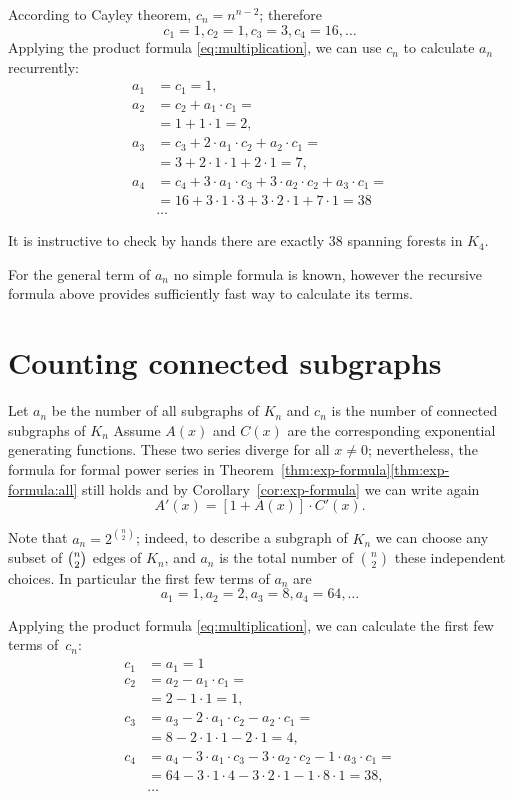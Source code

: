 According to Cayley theorem, $c_n=n^{n-2}$;
therefore 
\[c_1=1, c_2=1, c_3=3, c_4=16,\dots\]
Applying the product formula \ref{eq:multiplication}, we can use $c_n$ to calculate $a_n$ recurrently:
\begin{align*}
a_1&=c_1=1,
\\
a_2&=c_2+a_1\cdot c_1=
\\&=1+1\cdot 1=2,
\\
a_3&=c_3+2\cdot a_1\cdot c_2+ a_2\cdot c_1=
\\
&=3+2\cdot1\cdot 1+2\cdot 1=7,
\\
a_4&=c_4+3\cdot a_1\cdot c_3+3\cdot a_2\cdot c_2+a_3\cdot c_1=
\\&=16+3\cdot 1\cdot 3+3\cdot 2\cdot 1+7\cdot 1=38
\\
&\dots
\end{align*}

It is instructive to check by hands there are exactly $38$ spanning forests in $K_4$.

For the general term of $a_n$ no simple formula is known,
however the recursive formula above provides sufficiently fast way to calculate its terms.


\section*{Counting connected subgraphs}

Let $a_n$ be the number of all subgraphs of $K_n$ and $c_n$ is the number of connected subgraphs of $K_n$
Assume $A(x)$ and $C(x)$ are the corresponding exponential generating functions.
These two series diverge for all $x\ne 0$;
nevertheless, the formula for formal power series in Theorem~\ref{thm:exp-formula}\ref{thm:exp-formula:all}
still holds and by Corollary~\ref{cor:exp-formula} we can write again
\[A'(x)=[1+A(x)]\cdot C'(x).\]

Note that $a_n=2^{\binom n2}$;
indeed, to describe a subgraph of $K_n$ we can choose any subset of $\tbinom n2$ edges of $K_n$, and $a_n$ is the total number of $\binom n2$ these independent choices.
In particular the first few terms of $a_n$ are
\[a_1=1, a_2=2, a_3=8, a_4=64,\dots\]

Applying the product formula \ref{eq:multiplication}, we can calculate the first few terms of~$c_n$:
\begin{align*}
c_1&=a_1=1
\\
c_2&=a_2-a_1\cdot c_1=
\\
&=2-1\cdot 1=1,
\\
c_3&=a_3-2\cdot a_1\cdot c_2- a_2\cdot c_1=
\\
&=8-2\cdot1\cdot 1-2\cdot 1=4,
\\
c_4&=a_4-3\cdot a_1\cdot c_3-3\cdot a_2\cdot c_2-1\cdot a_3\cdot c_1=
\\
&=64-3\cdot 1\cdot 4-3\cdot 2\cdot 1-1\cdot 8\cdot 1=38,
\\
&\dots
\end{align*}

